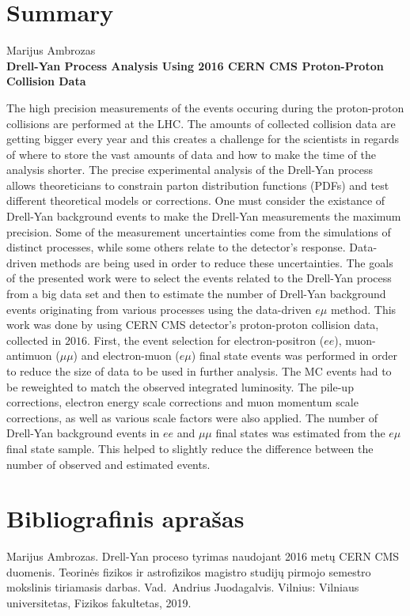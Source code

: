\documentclass[a4paper, 12pt]{article}
\newcommand{\emu}{e\mu}
\newcommand{\mumu}{\mu\mu}
\begin{document}
\clearpage
{}



\clearpage
\section*{Summary}
\begin{centering}
Marijus Ambrozas\\
\textbf{Drell-Yan Process Analysis Using 2016 CERN CMS Proton-Proton Collision Data}\\
\end{centering}
\vspace{0.5cm}
The high precision measurements of the events occuring during the proton-proton collisions are performed
at the LHC.
The amounts of collected collision data are getting bigger every year and this creates a challenge for
the scientists in regards of where to store the vast amounts of data and how to make the time of the
analysis shorter.
The precise experimental analysis of the Drell-Yan process allows theoreticians to constrain parton
distribution functions (PDFs) and test different theoretical models or corrections.
One must consider the existance of Drell-Yan background events to make the Drell-Yan measurements
the maximum precision.
Some of the measurement uncertainties come from the simulations of distinct processes, while some others
relate to the detector's response.
Data-driven methods are being used in order to reduce these uncertainties.
The goals of the presented work were to select the events related to the Drell-Yan process from a big data set
and then to estimate the number of Drell-Yan background events originating from various processes using the
data-driven $e\mu$ method.
This work was done by using CERN CMS detector's proton-proton collision data, collected in $2016$.
First, the event selection for electron-positron ($ee$), muon-antimuon ($\mumu$) and electron-muon ($\emu$)
final state events was performed in order to reduce the size of data to be used in further analysis.
The MC events had to be reweighted to match the observed integrated luminosity.
The pile-up corrections, electron energy scale corrections and muon momentum scale corrections, as well as
various scale factors were also applied.
The number of Drell-Yan background events in $ee$ and $\mumu$ final states was estimated from the $e\mu$ final
state sample.
This helped to slightly reduce the difference between the number of observed and estimated events.

\clearpage
\section*{Bibliografinis aprašas}
Marijus Ambrozas. Drell-Yan proceso tyrimas naudojant 2016 metų CERN CMS duomenis.
Teorinės fizikos ir astrofizikos magistro studijų pirmojo semestro mokslinis tiriamasis darbas.
Vad.\ Andrius Juodagalvis. Vilnius: Vilniaus universitetas, Fizikos fakultetas, 2019.
\end{document}
